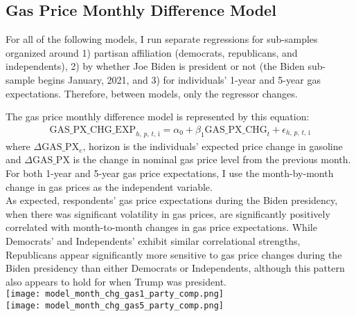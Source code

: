 \documentclass{article}
\begin{document}
\raggedright \subsection{Gas Price Monthly Difference Model}

\noindent For all of the following models, I run separate regressions for sub-samples organized around 1) partisan affiliation (democrats, republicans, and independents), 2) by whether Joe Biden is president or not (the Biden sub-sample begins January, 2021, and 3) for individuals' 1-year and 5-year gas expectations. Therefore, between models, only the regressor changes. 

The gas price monthly difference model is represented by this equation:
\begin{gather}
	 \text{GAS\_PX\_CHG\_EXP}_{h\text{, }p\text{, }t\text{, i}} = \alpha_0 + \beta_1 \text{GAS\_PX\_CHG}_t + \epsilon_{h\text{, }p\text{, }t\text{, i}}
\end{gather}
where $\Delta \text{GAS\_PX}_e\text{, horizon}$ is the individuals' expected price change in gasoline and $\Delta \text{GAS\_PX}$ is the change in nominal gas price level from the previous month. For both 1-year and 5-year gas price expectations, I use the month-by-month change in gas prices as the independent variable. \\
\vspace{0.1in}
As expected, respondents' gas price expectations during the Biden presidency, when there was significant volatility in gas prices, are significantly positively correlated with month-to-month changes in gas price expectations. While Democrats' and Independents' exhibit similar correlational strengths, Republicans appear significantly more sensitive to gas price changes during the Biden presidency than either Democrats or Independents, although this pattern also appears to hold for when Trump was president. \\
\vspace{0.1in}
\centering \texttt{[image: model\_month\_chg\_gas1\_party\_comp.png]} \\
\texttt{[image: model\_month\_chg\_gas5\_party\_comp.png]} 
\end{document}
